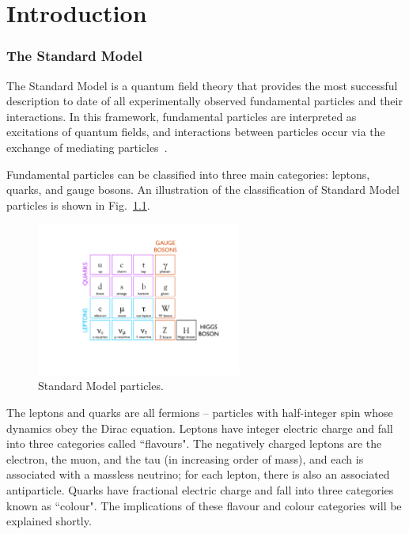 \chapter{Introduction\label{sec:intro}}



\subsection{The Standard Model\label{sec:SM}}

The Standard Model is a quantum field theory that provides the most successful description to date of all experimentally observed fundamental particles and their interactions. In this framework, fundamental particles are interpreted as excitations of quantum fields, and interactions between particles occur via the exchange of mediating particles~\cite{BettiniPhysics}.

Fundamental particles can be classified into three main categories: leptons, quarks, and gauge bosons. An illustration of the classification of Standard Model particles is shown in Fig.~\ref{fig:StandardModelTable}.

\begin{figure}
   \begin{center}
      \includegraphics[width=0.6\textwidth]{figures/StandardModelTable}
      \caption{Standard Model particles.}
      \label{fig:StandardModelTable}
   \end{center}
\end{figure}

The leptons and quarks are all fermions -- particles with half-integer spin whose dynamics obey the Dirac equation. Leptons have integer electric charge and fall into three categories called ``flavours". The negatively charged leptons are the electron, the muon, and the tau (in increasing order of mass), and each is associated with a massless neutrino; for each lepton, there is also an associated antiparticle. Quarks have fractional electric charge and fall into three categories known as ``colour". The implications of these flavour and colour categories will be explained shortly.

